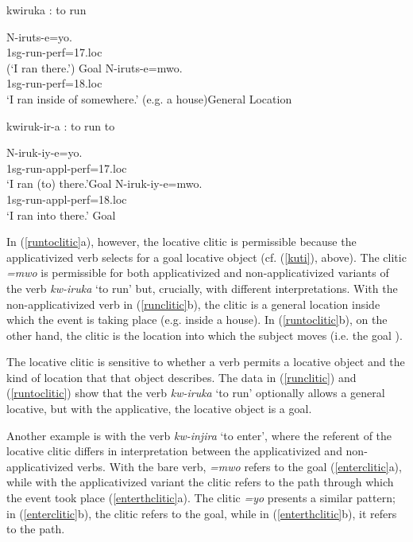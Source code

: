 \documentclass[output=paper]{langsci/langscibook}
\begin{document}
 
\begin{exe}
	\ex\label{runclitic}{\sc kwiruka} : to run \begin{xlist}
		\ex\gll *N-iruts-e=yo.\\
				1{\sc sg-}run-{\sc perf=17.loc}\\
				\glt (`I ran there.') \hfill *Goal
		\ex\gll N-iruts-e=mwo. \\
				1{\sc sg-}run-{\sc perf=18.loc}\\
				\glt `I ran inside of somewhere.' (e.g. a house)\hfill General Location
	\end{xlist}
	\ex\label{runtoclitic}{\sc kwiruk-ir-a} : to run to\begin{xlist}
		\ex\gll N-iruk-iy-e=yo.\\
				1{\sc sg}-run-{\sc appl-perf=17.loc}\\
				\glt `I ran (to) there.'\hfill Goal
		\ex\gll N-iruk-iy-e=mwo.\\
				1{\sc sg}-run-{\sc appl-perf=18.loc}\\
				\glt `I ran into there.' \hfill Goal
	\end{xlist}
\end{exe}
In (\ref{runtoclitic}a), however, the locative clitic is permissible because the applicativized verb selects for a {\sc goal}  locative object (cf. (\ref{kuti}), above). The clitic \emph{=mwo} is permissible for both applicativized and  non-applicativized variants of the verb \emph{kw-iruka} `to run' but, crucially, with different interpretations. With the non-applicativized verb in (\ref{runclitic}b), the clitic is a general location inside which the event is taking place (e.g. inside a house). In (\ref{runtoclitic}b), on the other hand,  the clitic is the location into which the subject moves (i.e. the {\sc goal} ).  

The locative clitic is sensitive to whether a verb permits a locative object and the kind of location that that object describes. The data in (\ref{runclitic}) and (\ref{runtoclitic}) show that the verb \emph{kw-iruka} `to run' optionally allows a general {\sc locative}, but with the applicative, the locative object is a {\sc goal}.


 Another example is with the verb \emph{kw-injira} `to enter', where the referent of the locative clitic differs in interpretation between the applicativized and non-applicativized verbs. With the bare verb, \emph{=mwo} refers to the {\sc goal} (\ref{enterclitic}a), while with the applicativized variant the clitic refers to the {\sc path} through which the event took place (\ref{enterthclitic}a). The clitic \emph{=yo} presents a similar pattern; in (\ref{enterclitic}b), the clitic refers to the {\sc goal}, while in (\ref{enterthclitic}b), it refers to the {\sc path}.
 
\end{document}
